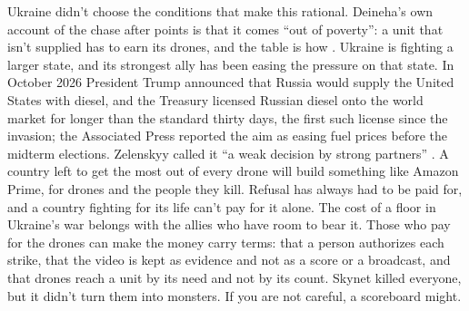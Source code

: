 Ukraine didn't choose the conditions that make this rational. Deineha's own account of the chase after points is that it comes “out of poverty”: a unit that isn't supplied has to earn its drones, and the table is how \autocite{deineha2025ebaly}. Ukraine is fighting a larger state, and its strongest ally has been easing the pressure on that state. In October 2026 President Trump announced that Russia would supply the United States with diesel, and the Treasury licensed Russian diesel onto the world market for longer than the standard thirty days, the first such license since the invasion; the Associated Press reported the aim as easing fuel prices before the midterm elections. Zelenskyy called it “a weak decision by strong partners” \autocite{price2026diesel}. A country left to get the most out of every drone will build something like Amazon Prime, for drones and the people they kill. Refusal has always had to be paid for, and a country fighting for its life can't pay for it alone. The cost of a floor in Ukraine's war belongs with the allies who have room to bear it. Those who pay for the drones can make the money carry terms: that a person authorizes each strike, that the video is kept as evidence and not as a score or a broadcast, and that drones reach a unit by its need and not by its count. Skynet killed everyone, but it didn't turn them into monsters. If you are not careful, a scoreboard might.
